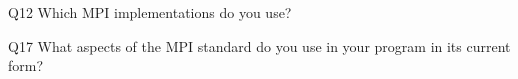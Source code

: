 \begin{description}%
\item{Q12} Which MPI implementations do you use?%
\item{Q17} What aspects of the MPI standard do you use in your program in its current form?%
\end{description}%

